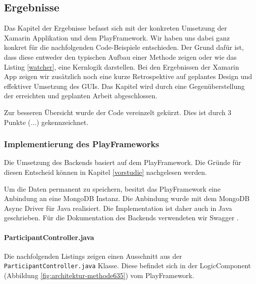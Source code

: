 \subsection{Ergebnisse}
Das Kapitel der Ergebnisse befasst sich mit der konkreten Umsetzung der Xamarin Applikation und dem PlayFramework. Wir haben uns dabei ganz konkret für die nachfolgenden Code-Beispiele entschieden. Der Grund dafür ist, dass diese entweder den typischen Aufbau einer Methode zeigen oder wie das Listing \ref{watcher}, eine Kernlogik darstellen. 
Bei den Ergebnissen der Xamarin App zeigen wir zusätzlich noch eine kurze Retrospektive auf geplantes Design und effektiver Umsetzung des GUIs. Das Kapitel wird durch eine Gegenüberstellung der erreichten und geplanten Arbeit abgeschlossen.

Zur besseren Übersicht wurde der Code vereinzelt gekürzt. Dies ist durch 3 Punkte (...) gekennzeichnet.

\subsubsection{Implementierung des PlayFrameworks}
Die Umsetzung des Backends basiert auf dem PlayFramework. Die Gründe für diesen Entscheid können in Kapitel \ref{vorstudie} nachgelesen werden. 

Um die Daten permanent zu speichern, besitzt das PlayFramework eine Anbindung an eine MongoDB Instanz. Die Anbindung wurde mit dem MongoDB Async Driver für Java \cite{MongoDBAsyncDriver} realisiert. Die Implementation ist daher auch in Java geschrieben. Für die Dokumentation des Backends verwendeten wir Swagger \cite{swagger}.

\paragraph*{ParticipantController.java}
Die nachfolgenden Listings zeigen einen Ausschnitt aus der \texttt{ParticipantController.java} Klasse. Diese befindet sich in der LogicComponent (Abbildung \ref{fig:architektur-methode635}) vom PlayFramework.


